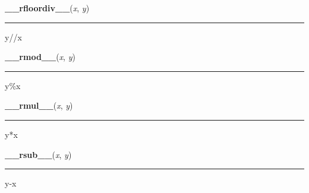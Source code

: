 \hspace{.8\funcindent}\begin{boxedminipage}{\funcwidth}

    \raggedright \textbf{\_\_rfloordiv\_\_}(\textit{x}, \textit{y})

    \vspace{-1.5ex}

    \rule{\textwidth}{0.5\fboxrule}
\setlength{\parskip}{2ex}
    y//x

\setlength{\parskip}{1ex}
    \end{boxedminipage}

    \label{pygame:Color:__rmod__}

    \vspace{0.5ex}

\hspace{.8\funcindent}\begin{boxedminipage}{\funcwidth}

    \raggedright \textbf{\_\_rmod\_\_}(\textit{x}, \textit{y})

    \vspace{-1.5ex}

    \rule{\textwidth}{0.5\fboxrule}
\setlength{\parskip}{2ex}
    y\%x

\setlength{\parskip}{1ex}
    \end{boxedminipage}

    \label{pygame:Color:__rmul__}

    \vspace{0.5ex}

\hspace{.8\funcindent}\begin{boxedminipage}{\funcwidth}

    \raggedright \textbf{\_\_rmul\_\_}(\textit{x}, \textit{y})

    \vspace{-1.5ex}

    \rule{\textwidth}{0.5\fboxrule}
\setlength{\parskip}{2ex}
    y*x

\setlength{\parskip}{1ex}
    \end{boxedminipage}

    \label{pygame:Color:__rsub__}

    \vspace{0.5ex}

\hspace{.8\funcindent}\begin{boxedminipage}{\funcwidth}

    \raggedright \textbf{\_\_rsub\_\_}(\textit{x}, \textit{y})

    \vspace{-1.5ex}

    \rule{\textwidth}{0.5\fboxrule}
\setlength{\parskip}{2ex}
    y-x

\setlength{\parskip}{1ex}
    \end{boxedminipage}

